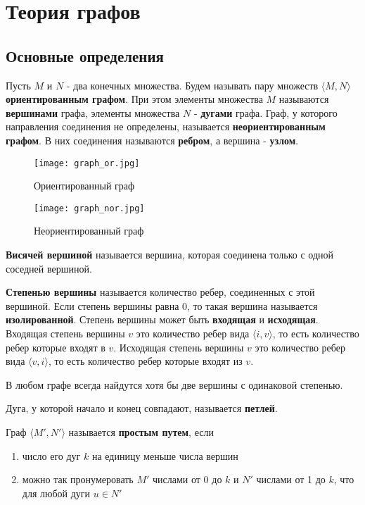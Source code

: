 \chapter{Теория графов}
\section{Основные определения}
Пусть $M$ и $N$ - два конечных множества. Будем называть пару множеств $\langle M, N \rangle$ \textbf{ориентированным графом}.
При этом элементы множества $M$ называются \textbf{вершинами} графа, элементы множества $N$ - \textbf{дугами} графа. 
Граф, у которого направления соединения не определены, называется \textbf{неориентированным графом}. В них
соединения называются \textbf{ребром}, а вершина - \textbf{узлом}.

\begin{figure*}[!h]
    \centering
    \begin{minipage}[t]{4cm}
        \centering
        \texttt{[image: graph\_or.jpg]}
        \caption{Ориентированный граф}
    \end{minipage}
    \hspace{3cm}
    \begin{minipage}[t]{4cm}
        \centering
        \texttt{[image: graph\_nor.jpg]}
        \caption{Неориентированный граф}
    \end{minipage}
\end{figure*}

\textbf{Висячей вершиной} называется вершина, которая соединена только с одной соседней вершиной.

\textbf{Степенью вершины} называется количество ребер, соединенных с этой вершиной.
Если степень вершины равна 0, то такая вершина называется \textbf{изолированной}.
Степень вершины может быть \textbf{входящая} и \textbf{исходящая}. Входящая степень вершины $v$
это количество ребер вида $\langle i, v \rangle$, то есть количество ребер которые входят в $v$.
Исходящая степень вершины $v$ это количество ребер вида $\langle v, i \rangle$, то есть количество ребер
которые входят из $v$.

\begin{thm}
    В любом графе всегда найдутся хотя бы две вершины с одинаковой степенью.
\end{thm}

Дуга, у которой начало и конец совпадают, называется \textbf{петлей}.

Граф $\langle M', N'\rangle$ называется \textbf{простым путем}, если
\begin{enumerate}
    \item число его дуг $k$ на единицу меньше числа вершин
    \item можно так пронумеровать $M'$ числами от 0 до $k$ и $N'$ числами от 1 до $k$,
    что для любой дуги $u \in N'$
\end{enumerate}

